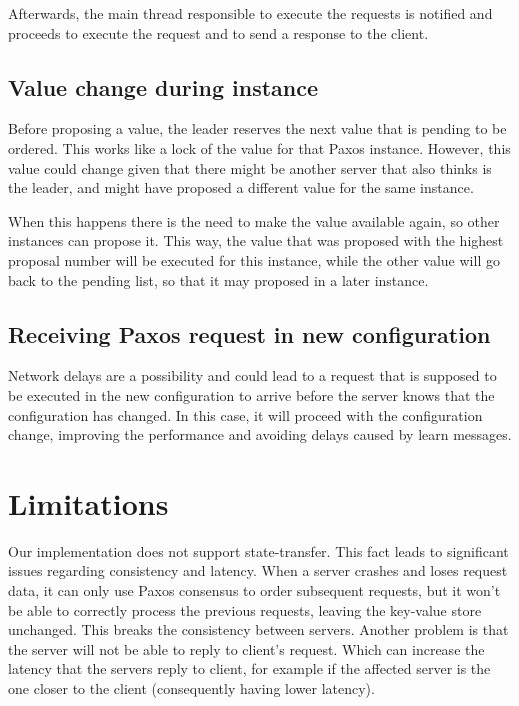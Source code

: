 \documentclass[times, 10pt,twocolumn]{article}
\begin{document}
Afterwards, the main thread responsible to execute the requests is notified and proceeds to execute the request and to send a response to the client.

\subsection{Value change during instance}
Before proposing a value, the leader reserves the next value that is pending to be ordered. This works like a lock of the value for that Paxos instance. However, this value could change given that there might be another server that also thinks is the leader, and might have proposed a different value for the same instance.

When this happens there is the need to make the value available again, so other instances can propose it. This way, the value that was proposed with the highest proposal number will be executed for this instance, while the other value will go back to the pending list, so that it may proposed in a later instance.

\subsection{Receiving Paxos request in new configuration}

Network delays are a possibility and could lead to a request that is supposed to be executed in the new configuration to arrive before the server knows that the configuration has changed. In this case, it will proceed with the configuration change, improving the performance and avoiding delays caused by learn messages.

\section{Limitations}

Our implementation does not support state-transfer. This fact leads to significant issues regarding consistency and latency. When a server crashes and loses request data, it can only use Paxos consensus to order subsequent requests, but it won't be able to correctly process the previous requests, leaving the key-value store unchanged. This breaks the consistency between servers. Another problem is that the server will not be able to reply to client's request. Which can increase the latency that the servers reply to client, for example if the affected server is the one closer to the client (consequently having lower latency).
\end{document}
